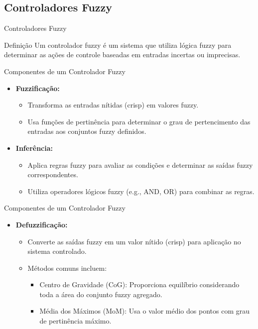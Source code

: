 \documentclass{beamer}
\begin{document}
\subsection{Controladores Fuzzy}

\begin{frame}{Controladores Fuzzy}

    \begin{block}{Definição}
        Um controlador fuzzy é um sistema que utiliza lógica fuzzy para determinar as ações de controle baseadas em entradas incertas ou imprecisas.
    \end{block}

\end{frame}

\begin{frame}{Componentes de um Controlador Fuzzy}
    \begin{itemize}
            \item \textbf{Fuzzificação:}
            \begin{itemize}
                \item Transforma as entradas nítidas (crisp) em valores fuzzy.
                \item Usa funções de pertinência para determinar o grau de pertencimento das entradas aos conjuntos fuzzy definidos.
            \end{itemize}
            \item \textbf{Inferência:}
            \begin{itemize}
                \item Aplica regras fuzzy para avaliar as condições e determinar as saídas fuzzy correspondentes.
                \item Utiliza operadores lógicos fuzzy (e.g., AND, OR) para combinar as regras.
            \end{itemize}

        \end{itemize}
 \end{frame}

 \begin{frame}{Componentes de um Controlador Fuzzy}
    \begin{itemize}
            \item \textbf{Defuzzificação:}
            \begin{itemize}
                \item Converte as saídas fuzzy em um valor nítido (crisp) para aplicação no sistema controlado.
                \item Métodos comuns incluem:
                \begin{itemize}
                    \item Centro de Gravidade (CoG): Proporciona equilíbrio considerando toda a área do conjunto fuzzy agregado.
                    \item Média dos Máximos (MoM): Usa o valor médio dos pontos com grau de pertinência máximo.
                \end{itemize}
            \end{itemize}
        \end{itemize}
 \end{frame}
\end{document}
